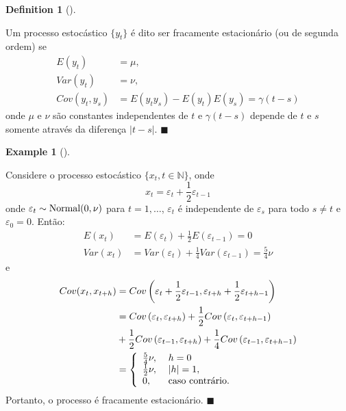 \documentclass[
  letterpaper,
  DIV=11,
  numbers=noendperiod]{scrartcl}
\theoremstyle{definition}
\newtheorem{example}{Example}[chapter]
\theoremstyle{definition}
\newtheorem{definition}{Definition}[chapter]
\theoremstyle{plain}
\theoremstyle{plain}
\theoremstyle{remark}
\begin{document}
\begin{definition}[]\protect\hypertarget{def-fracamente}{}\label{def-fracamente}

Um processo estocástico \(\{y_t\}\) é dito ser fracamente estacionário
(ou de segunda ordem) se \begin{align*}
    E(y_t)&=\mu,\\
    Var(y_t)&=\nu,\\ 
    Cov(y_t,y_s)&=E(y_ty_s)-E(y_t)E(y_s)=\gamma(t-s)
    \end{align*} onde \(\mu\) e \(\nu\) são constantes independentes de
\(t\) e \(\gamma(t-s)\) depende de \(t\) e \(s\) somente através da
diferença \(|t-s|\). \(\blacksquare\)

\end{definition}

\begin{example}[]\protect\hypertarget{exm-fracamente1}{}\label{exm-fracamente1}

Considere o processo estocástico \(\{x_t,t\in\mathbb{N}\}\), onde
\[x_t = \varepsilon_t +\frac{1}{2}\varepsilon_{t-1}
\] onde \(\varepsilon_t\sim\hbox{Normal}(0,\nu)\) para \(t=1,\ldots\),
\(\varepsilon_t\) é independente de \(\varepsilon_s\) para todo
\(s\neq t\) e \(\varepsilon_0=0\). Então: \begin{align}
E(x_t)&=E(\varepsilon_t)+\frac{1}{2}E(\varepsilon_{t-1})=0\\
Var(x_t)&=Var(\varepsilon_t)+\frac{1}{4}Var(\varepsilon_{t-1})=\frac{5}{4}\nu
\end{align}
e \begin{align}
          Cov(x_t,x_{t+h})&=Cov\left(\varepsilon_t+\frac{1}{2}\varepsilon_{t-1},\varepsilon_{t+h}+\frac{1}{2}\varepsilon_{t+h-1}\right)\\
          &=Cov\left(\varepsilon_t,\varepsilon_{t+h}\right)+\frac{1}{2}Cov\left(\varepsilon_t,\varepsilon_{t+h-1}\right)\\
          &+\frac{1}{2}Cov\left(\varepsilon_{t-1},\varepsilon_{t+h}\right)+\frac{1}{4}Cov\left(\varepsilon_{t-1},\varepsilon_{t+h-1}\right)\\
          &=\left\{ \begin{array}{ll}
          \frac{5}{4}\nu,&\; h = 0 \\         
          \frac{1}{2}\nu,&\; |h|=1,\\
          0,&\;\hbox{caso contrário.}
          \end{array} \right.
    \end{align} Portanto, o processo é fracamente estacionário.
\(\blacksquare\)

\end{example}
\end{document}
